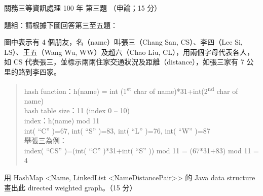 \begin{pastexam}[label={px:gw3-100-ds-03}]{關務三等資訊處理 100 年 第三題}
（申論；15 分）

題組：請根據下圖回答第三至五題：

圖中表示有 4 個朋友，名（name）叫張三（Chang San, CS）、李四（Lee Si, LS）、王五（Wang Wu, WW）及趙六（Chao Liu, CL），用兩個字母代表各人，如 CS 代表張三，並標示兩兩住家交通狀況及距離（distance），如張三家有 7 公里的路到李四家。
\begin{center}
\end{center}
\begin{quote}
hash function：h(name) = int (1\textsuperscript{st} char of name)*31+int(2\textsuperscript{nd} char of name)\\
hash table size：11 \quad (index 0 – 10)\\
index：h(name) mod 11\\
int( “C” )=67, int( “S” )=83, int( “L” )=76, int( “W” )=87\\
舉張三為例：\\
index( “CS” )=(int( “C” )*31+int( “S” )) mod 11 = (67*31+83) mod 11 = 4
\end{quote}

用 HashMap <Name, LinkedList <NameDistancePair>> 的 Java data structure 畫出此 directed weighted graph。（15 分）
\end{pastexam}

